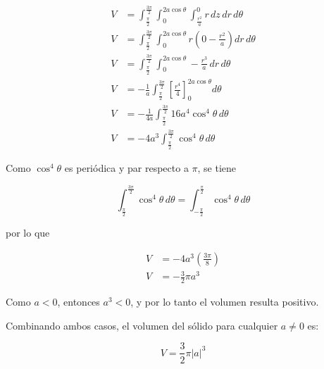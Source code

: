 \begin{itemize}
\begin{align*}
V &= \int_{\frac{\pi}{2}}^{\frac{3\pi}{2}} \int_{0}^{2a \cos \theta} \int_{\frac{r^2}{a}}^{0} r \, dz \, dr \, d\theta \\
V &= \int_{\frac{\pi}{2}}^{\frac{3\pi}{2}} \int_{0}^{2a \cos \theta} r \left(0 - \frac{r^2}{a}\right) dr \, d\theta \\
V &= \int_{\frac{\pi}{2}}^{\frac{3\pi}{2}} \int_{0}^{2a \cos \theta} -\frac{r^3}{a} \, dr \, d\theta \\
V &= -\frac{1}{a} \int_{\frac{\pi}{2}}^{\frac{3\pi}{2}} \left[ \frac{r^4}{4} \right]_{0}^{2a \cos \theta} d\theta \\
V &= -\frac{1}{4a} \int_{\frac{\pi}{2}}^{\frac{3\pi}{2}} 16a^4 \cos^4 \theta \, d\theta \\
V &= -4a^3 \int_{\frac{\pi}{2}}^{\frac{3\pi}{2}} \cos^4 \theta \, d\theta
\end{align*}

Como $\cos^4\theta$ es periódica y par respecto a $\pi$, se tiene

\[
\int_{\frac{\pi}{2}}^{\frac{3\pi}{2}} \cos^4\theta \, d\theta =
\int_{-\frac{\pi}{2}}^{\frac{\pi}{2}} \cos^4\theta \, d\theta
\]

por lo que

\begin{align*}
V &= -4a^3 \left(\frac{3\pi}{8}\right) \\
V &= -\frac{3}{2}\pi a^3
\end{align*}

Como $a<0$, entonces $a^3<0$, y por lo tanto el volumen resulta positivo.

\end{itemize}

Combinando ambos casos, el volumen del sólido para cualquier $a \neq 0$ es:

\begin{equation}
V = \frac{3}{2}\pi |a|^3
\end{equation}
